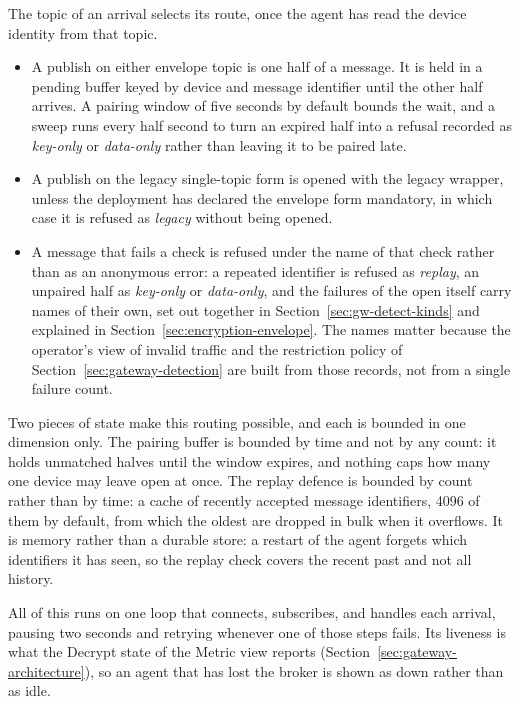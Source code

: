 \documentclass[12pt,a4paper]{report}
\begin{document}
The topic of an arrival selects its route, once the agent has read
the device identity from that topic.

\begin{itemize}
    \item A publish on either envelope topic is one half of a
    message. It is held in a pending buffer keyed by device and
    message identifier until the other half arrives. A pairing
    window of five seconds by default bounds the wait, and a sweep
    runs every half second to turn an expired half into a refusal
    recorded as \emph{key-only} or \emph{data-only} rather than
    leaving it to be paired late.
    \item A publish on the legacy single-topic form is opened with
    the legacy wrapper, unless the deployment has declared the
    envelope form mandatory, in which case it is refused as
    \emph{legacy} without being opened.
    \item A message that fails a check is refused under the name of
    that check rather than as an anonymous error: a repeated
    identifier is refused as \emph{replay}, an unpaired half as
    \emph{key-only} or \emph{data-only}, and the failures of the
    open itself carry names of their own, set out together in
    Section~\ref{sec:gw-detect-kinds} and explained in
    Section~\ref{sec:encryption-envelope}. The names
    matter because the operator's view of invalid traffic and the
    restriction policy of Section~\ref{sec:gateway-detection} are
    built from those records, not from a single failure count.
\end{itemize}

Two pieces of state make this routing possible, and each is bounded
in one dimension only. The pairing buffer is bounded by time and not
by any count: it holds unmatched halves until the window expires, and
nothing caps how many one device may leave open at once. The replay
defence is bounded by count rather than by time: a cache of recently
accepted message identifiers, 4096 of them by default, from which the
oldest are dropped in bulk when it overflows. It is memory rather
than a durable store: a restart of the agent forgets which
identifiers it has seen, so the replay check covers the recent past
and not all history.

All of this runs on one loop that connects, subscribes, and handles
each arrival, pausing two seconds and retrying whenever one of those
steps fails. Its liveness is what the Decrypt state of the Metric
view reports (Section~\ref{sec:gateway-architecture}), so an agent
that has lost the broker is shown as down rather than as idle.
\end{document}
